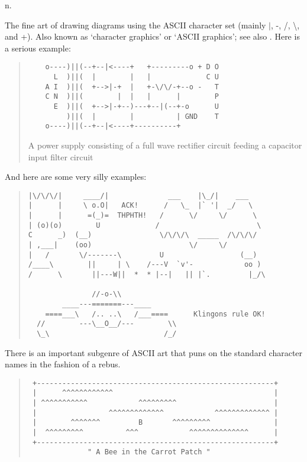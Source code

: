  n.

The fine art of drawing diagrams using the ASCII character set (mainly $\left|\right.$, -, /, \textbackslash, and +). Also known as
`character graphics' or `ASCII graphics'; see also . Here is a serious example:

\begin{quote}
	\begin{verbatim}
	o----)||(--+--|<----+   +---------o + D O
	  L  )||(  |        |   |             C U
	A I  )||(  +-->|-+  |   +-\/\/-+--o -   T
	C N  )||(        |  |   |      |        P
	  E  )||(  +-->|-+--)---+--|(--+-o      U
		 )||(  |        |          | GND    T
	o----)||(--+--|<----+----------+
	\end{verbatim}

	A power supply consisting of a full wave rectifier circuit feeding a capacitor input filter circuit
\end{quote}

And here are some very silly examples:

\begin{quote}
	\begin{verbatim}
|\/\/\/|     ____/|              ___    |\_/|    ___
|      |     \ o.O|   ACK!      /   \_  |` '|  _/   \
|      |      =(_)=  THPHTH!   /      \/     \/      \
| (o)(o)        U             /                       \
C      _)  (__)                \/\/\/\  _____  /\/\/\/
| ,___|    (oo)                       \/     \/
|   /       \/-------\         U                  (__)
/____\        ||     | \    /---V  `v'-            oo )
/      \       ||---W||  *  * |--|   || |`.         |_/\

               //-o-\\
        ____---=======---____
    ====___\   /.. ..\   /___====      Klingons rule OK!
  //        ---\__O__/---        \\
  \_\                           /_/
	\end{verbatim}
\end{quote}

There is an important subgenre of ASCII art that puns on the standard character names in the fashion of a rebus.

\begin{quote}
	\begin{verbatim}
 +--------------------------------------------------------+
 |      ^^^^^^^^^^^^                                      |
 | ^^^^^^^^^^^            ^^^^^^^^^                       |
 |                 ^^^^^^^^^^^^^            ^^^^^^^^^^^^^ |
 |        ^^^^^^^         B       ^^^^^^^^^               |
 |  ^^^^^^^^^          ^^^            ^^^^^^^^^^^^^^      |
 +--------------------------------------------------------+
              " A Bee in the Carrot Patch "
	\end{verbatim}
\end{quote}

